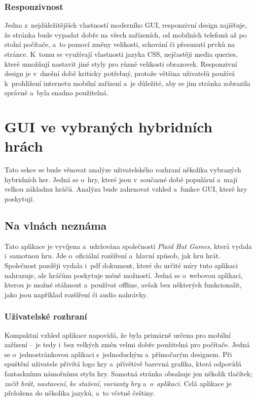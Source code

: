 \subsubsection*{Responzivnost}
Jedna z~nejdůležitějších vlastností moderního GUI, responzivní design zajišťuje, že stránka bude vypadat dobře na všech zařízeních, od mobilních telefonů až po stolní počítače, a~to pomocí změny velikosti, schování či přesunutí prvků na stránce. K~tomu se využívají vlastnosti jazyka CSS, nejčastěji media queries, které umožňují nastavit jiné styly pro různé velikosti obrazovek. Responzivní design je v~dnešní době kriticky potřebný, protože většina uživatelů používá k~prohlížení internetu mobilní zařízení a~je důležité, aby se jim stránka zobrazila správně a~byla snadno použitelná. \cite{responsive_design}

\section{GUI ve vybraných hybridních hrách}
Tato sekce se bude věnovat analýze uživatelského rozhraní několika vybraných hybridních her. Jedná se o~hry, které jsou v~současné době populární a~mají velkou základnu hráčů. Analýza bude zahrnovat vzhled a~funkce GUI, které hry poskytují.

\subsection{Na vlnách neznáma}
Tato aplikace je vyvíjena a~udržována společností \textit{Plaid Hat Games}, která vydala i~samotnou hru. Jde o~oficiální rozšíření a~hlavní způsob, jak hru hrát. Společnost později vydala i~pdf dokument, které do určité míry tuto aplikaci nahrazuje, ale hráčům poskytuje méně možností. Jedná se o~webovou aplikaci, kterou je možné stáhnout a~používat offline, avšak bez některých funkcionalit, jako jsou například rozšíření či audio nahrávky.

\subsubsection*{Uživatelské rozhraní}
Kompaktní vzhled aplikace napovídá, že byla primárně určena pro mobilní zařízení -- je tedy i~bez velkých změn velmi dobře použitelná pro počítače. Jedná se o~jednostránkovou aplikaci s~jednoduchým a~přímočarým designem. Při spuštění uživatele přivítá logo hry a~přívětivě barevná grafika, která odpovídá fantasknímu námořnímu stylu hry. Samotná stránka obsahuje jen několik tlačítek; \textit{začít hrát}, \textit{nastavení}, \textit{ke stažení}, \textit{varianty hry} a~\textit{o~aplikaci}. Celá aplikace je přeložena do několika jazyků, a~to včetně češtiny.

